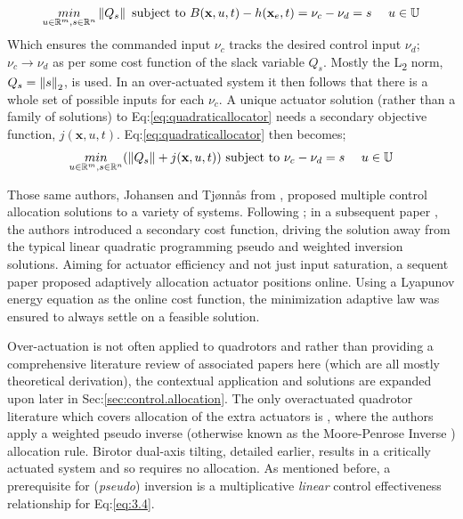 \begin{equation}\label{eq:quadraticallocator}
\underset{u \in \mathbb{R}^m ,s \in \mathbb{R}^n}{min}\left\lVert Q_s\right\rVert ~\text{subject to} ~B(\mathbf{x},u,t) - h(\mathbf{x}_e,t)=\nu_c-\nu_d=s~~~~u \in \mathbb{U}
\end{equation}
Which ensures the commanded input $\nu_c$ tracks the desired control input $\nu_d$; $\nu_c\rightarrow\nu_d$ as per some cost function of the slack variable $Q_s$. Mostly the L\textsubscript{2} norm, $Q_s=\left\lVert s\right\rVert_2$, is used. In an over-actuated system it then follows that there is a whole set of possible inputs for each $\nu_c$. A unique actuator solution (rather than a family of solutions) to Eq:\ref{eq:quadraticallocator} needs a secondary objective function, $j(\mathbf{x},u,t)$. Eq:\ref{eq:quadraticallocator} then becomes;
\begin{equation} \label{eq:quadraticallocatorcost}
\underset{u \in \mathbb{R}^m ,s \in \mathbb{R}^n}{min}(\left\lVert Q_s\right\rVert+j(\mathbf{x},u,t)) ~\text{subject to} ~\nu_c - \nu_d=s~~~~u \in \mathbb{U}
\end{equation}
\par
Those same authors, Johansen and Tj{\o}nn\r{a}s from \cite{allocation,efficientallocation,adaptiveallocation}, proposed multiple control allocation solutions to a variety of systems. Following \cite{allocation}; in a subsequent paper \cite{efficientallocation}, the authors introduced a secondary cost function, driving the solution away from the typical linear quadratic programming pseudo and weighted inversion solutions.  Aiming for actuator efficiency and not just input saturation, a sequent paper \cite{adaptiveallocation} proposed adaptively allocation actuator positions online. Using a Lyapunov energy equation as the online cost function, the minimization adaptive law was ensured to always settle on a feasible solution.
\par
Over-actuation is not often applied to quadrotors and rather than providing a comprehensive literature review of associated papers here (which are all mostly theoretical derivation), the contextual application and solutions are expanded upon later in Sec:\ref{sec:control.allocation}. The only overactuated quadrotor literature which covers allocation of the extra actuators is \cite{tiltgasco,tiltrihani}, where the authors apply a weighted pseudo inverse (otherwise known as the Moore-Penrose Inverse \cite{moorepenrose}) allocation rule. Birotor dual-axis tilting, detailed earlier, results in a critically actuated system and so requires no allocation. As mentioned before, a prerequisite for (\emph{pseudo}) inversion is a multiplicative \emph{linear} control effectiveness relationship for Eq:\ref{eq:3.4}. 
